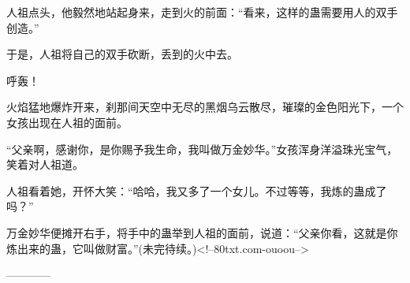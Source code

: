 \begin{this_body}
人祖点头，他毅然地站起身来，走到火的前面：“看来，这样的蛊需要用人的双手创造。”

于是，人祖将自己的双手砍断，丢到的火中去。

呼轰！

火焰猛地爆炸开来，刹那间天空中无尽的黑烟乌云散尽，璀璨的金色阳光下，一个女孩出现在人祖的面前。

“父亲啊，感谢你，是你赐予我生命，我叫做万金妙华。”女孩浑身洋溢珠光宝气，笑着对人祖道。

人祖看着她，开怀大笑：“哈哈，我又多了一个女儿。不过等等，我炼的蛊成了吗？”

万金妙华便摊开右手，将手中的蛊举到人祖的面前，说道：“父亲你看，这就是你炼出来的蛊，它叫做财富。”(未完待续。)<!--80txt.com-ouoou-->

------------

\end{this_body}

